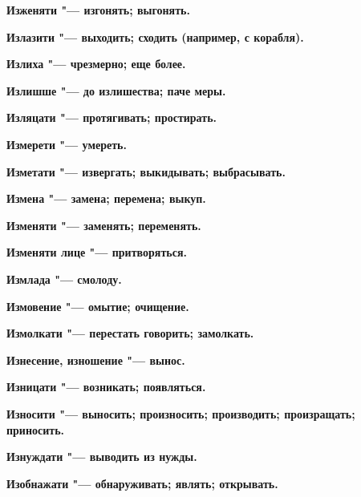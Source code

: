 \begin{mymulticols}{2}
\bfseries Изженяти\normalfont{} "--- изгонять; выгонять. 




\bfseries Излазити\normalfont{} "--- выходить; сходить (например, с корабля). 




\bfseries Излиха\normalfont{} "--- чрезмерно; еще более. 




\bfseries Излишше\normalfont{} "--- до излишества; паче меры. 




\bfseries Изляцати\normalfont{} "--- протягивать; простирать. 




\bfseries Измерети\normalfont{} "--- умереть. 




\bfseries Изметати\normalfont{} "--- извергать; выкидывать; выбрасывать. 




\bfseries Измена\normalfont{} "--- замена; перемена; выкуп. 




\bfseries Изменяти\normalfont{} "--- заменять; переменять. 




\bfseries Изменяти лице\normalfont{} "--- притворяться. 




\bfseries Измлада\normalfont{} "--- смолоду. 




\bfseries Измовение\normalfont{} "--- омытие; очищение. 




\bfseries Измолкати\normalfont{} "--- перестать говорить; замолкать. 




\bfseries Изнесение, изношение\normalfont{} "--- вынос. 




\bfseries Изницати\normalfont{} "--- возникать; появляться. 




\bfseries Износити\normalfont{} "--- выносить; произносить; производить; произращать; приносить. 




\bfseries Изнуждати\normalfont{} "--- выводить из нужды. 




\bfseries Изобнажати\normalfont{} "--- обнаруживать; являть; открывать. 





\end{mymulticols}
